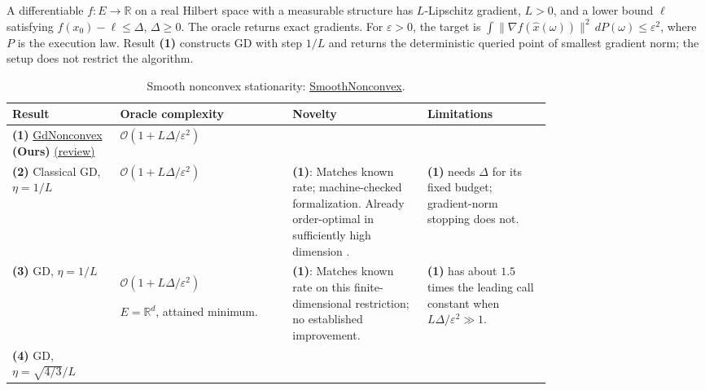 \begin{table}[tp]
\centering
\caption{Smooth nonconvex stationarity: \href{https://github.com/k3nfalt/longtails/blob/main/LongTails/Setups/SmoothNonconvex.lean}{SmoothNonconvex}.}\label{tab:SmoothNonconvex}
\parbox{\linewidth}{\footnotesize A differentiable $f:E\to\mathbb R$ on a real Hilbert space with a measurable structure has $L$-Lipschitz gradient, $L>0$, and a lower bound $\ell$ satisfying $f(x_0)-\ell\le\Delta$, $\Delta\ge0$. The oracle returns exact gradients. For $\varepsilon>0$, the target is $\int\|\nabla f(\widehat x(\omega))\|^2\,dP(\omega)\le\varepsilon^2$, where $P$ is the execution law. Result \textbf{(1)} constructs GD with step $1/L$ and returns the deterministic queried point of smallest gradient norm; the setup does not restrict the algorithm.}\par\smallskip
\begin{threeparttable}
\footnotesize
\setlength{\tabcolsep}{4pt}\renewcommand{\arraystretch}{1.25}
\begin{tabularx}{\linewidth}{@{}>{\raggedright\arraybackslash}p{0.20\linewidth}>{\raggedright\arraybackslash}p{0.32\linewidth}>{\raggedright\arraybackslash}p{0.25\linewidth}>{\raggedright\arraybackslash}X@{}}
\toprule
\textbf{Result} & \textbf{Oracle complexity} & \textbf{Novelty} & \textbf{Limitations} \\
\midrule
\textbf{(1)} \href{https://github.com/k3nfalt/longtails/blob/main/LongTails/Theorems/GdNonconvex.lean}{Gd\allowbreak Nonconvex} \textbf{(Ours)} \href{https://github.com/k3nfalt/longtails/blob/main/scripts/reviews/GdNonconvex.md}{(review)}
& $\mathcal{O}(1+L\Delta/\varepsilon^2)$ & & \\
\midrule[1.2pt]
\textbf{(2)} Classical GD, $\eta=1/L$ \citep[\S1]{sncAdKZ2022v3}
& $\mathcal{O}(1+L\Delta/\varepsilon^2)$
& \textbf{(1)}: Matches known rate; machine-checked formalization. Already order-optimal in sufficiently high dimension \citep[Thms.~1--2, $p=1$]{sncCarmon2020v3}.
& \textbf{(1)} needs $\Delta$ for its fixed budget; gradient-norm stopping does not. \\
\midrule
\textbf{(3)} GD, $\eta=1/L$ \citep[Thm.~2, (16)]{sncAdKZ2022v3}
& $\mathcal{O}(1+L\Delta/\varepsilon^2)$\par $E=\mathbb R^d$, attained minimum.
& \textbf{(1)}: Matches known rate on this finite-dimensional restriction; no established improvement.
& \textbf{(1)} has about $1.5$ times the leading call constant when $L\Delta/\varepsilon^2\gg1$. \\
\midrule
\textbf{(4)} GD, $\eta=\sqrt{4/3}/L$ \citep[Thm.~2, (15)]{sncAdKZ2022v3}

\end{tabularx}
\end{threeparttable}
\end{table}

